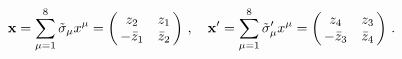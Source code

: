 \begin{equation}
\mathbf{x}=\sum_{\mu =1}^8 \tilde{\sigma}_{\mu}x^{\mu}=
\left( \begin{array}{@{\,}cc@{\,}}
   z_2 & z_1\\
  -\bar{z}_1  &  \bar{z}_2
  \end{array}  \right)\,,\quad 
\mathbf{x}'=\sum_{\mu =1}^8 \tilde{\sigma}'_{\mu}x^{\mu}=
\left( \begin{array}{@{\,}cc@{\,}}
   z_4 & z_3\\
  -\bar{z}_3  &  \bar{z}_4
  \end{array}  \right)\,. \label{eq:2.4}
\end{equation}

